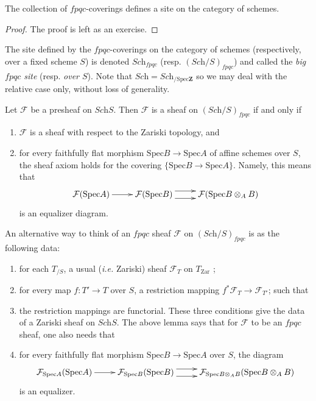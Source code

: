 \begin{lemma}
The collection of $fpqc$-coverings defines a site on the category of schemes.
\end{lemma}

\begin{proof}
The proof is left as an exercise.
\end{proof}

\begin{definition}
The site defined by the $fpqc$-coverings on the category of schemes 
(respectively, over a fixed scheme $S$) is denoted $\textit{Sch}_{fpqc}$ (resp. 
$(\textit{Sch}/S)_{fpqc}$) and called the \emph{big $fpqc$ site} (resp. \emph{over 
$S$}). Note that $\textit{Sch} = \textit{Sch}_{/\text{Spec}\mathbf{Z}}$ so we 
may deal with the relative case only, without loss of generality. 
\end{definition}

\begin{lemma}\label{fpqc-sheaves}
Let $\mathcal{F}$ be a presheaf on $\textit{Sch}S$. Then $\mathcal{F}$ is a 
sheaf on $(\textit{Sch}/S)_{fpqc}$ if and only if
\begin{enumerate}
\item $\mathcal{F}$ is a sheaf with respect to the Zariski topology, and
\item for every faithfully flat morphism $\text{Spec} B \to \text{Spec} A$ of 
affine schemes over $S$, the sheaf axiom holds for the covering $\{\text{Spec} 
B \to \text{Spec} A\}$. Namely, this means that 
$$
\xymatrix{
\mathcal{F}(\text{Spec} A) \ar[r] &
\mathcal{F}(\text{Spec} B) \ar@<1ex>[r] \ar@<-1ex>[r] &
\mathcal{F}(\text{Spec} B \otimes_A B)
}
$$
is an equalizer diagram.
\end{enumerate}
\end{lemma}

\noindent
An alternative way to think of an $fpqc$ sheaf $\mathcal{F}$ on 
$(\textit{Sch}/S)_{fpqc}$ is as the following data:
\begin{enumerate}
\item for each $T_{/S}$, a usual ({\it i.e.} Zariski) sheaf $\mathcal{F}_T$ on 
$T_{\mathrm{Zar}}$ ;
\item for every map $f : T' \to T$ over $S$, a restriction mapping $f^* 
\mathcal{F}_T \to \mathcal{F}_{T'} $; such that
\item the restriction mappings are functorial. These three conditions give the 
data of a Zariski sheaf on $\textit{Sch}S$. The above lemma says that for 
$\mathcal{F}$ to be an $fpqc$ sheaf, one also needs that
\item for every faithfully flat morphism $\text{Spec} B \to \text{Spec} A$ over 
$S$, the diagram 
$$
\xymatrix{
\mathcal{F}_{\text{Spec} A}(\text{Spec} A) \ar[r] &
\mathcal{F}_{\text{Spec} B}(\text{Spec} B) \ar@<1ex>[r] \ar@<-1ex>[r] &
\mathcal{F}_{\text{Spec} B \otimes_A B}(\text{Spec} B \otimes_A B)
}
$$
is an equalizer.
\end{enumerate}

